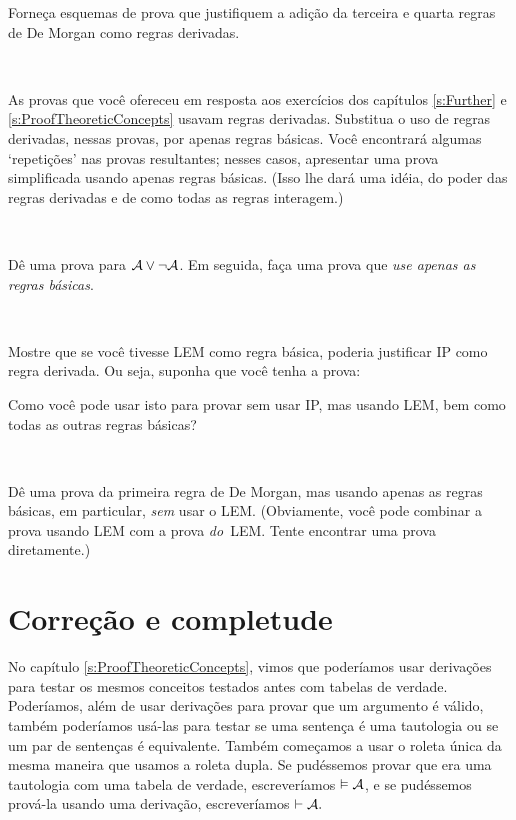 \practiceproblems

\problempart
Forne\c ca esquemas de prova que justifiquem a adi\c c\~ao da terceira e quarta regras de De Morgan como regras derivadas.

\

\problempart
As provas que voc\^e ofereceu em resposta aos exerc\'icios dos cap\'itulos  \ref{s:Further} e \ref{s:ProofTheoreticConcepts} usavam regras derivadas. Substitua o uso de regras derivadas, nessas provas, por apenas regras b\'asicas. Voc\^e encontrar\'a algumas `repeti\c c\~oes' nas provas resultantes; nesses casos, apresentar uma prova simplificada usando apenas regras b\'asicas. (Isso lhe dar\'a uma id\'eia, do poder das regras derivadas e de como todas as regras interagem.)

\

\problempart
D\^e uma prova para $\mathcal{A} \vee \neg\mathcal{A}$. Em seguida, fa\c ca uma prova que \emph{use apenas as regras b\'asicas}.

\

\problempart
Mostre que se voc\^e tivesse LEM como regra b\'asica, poderia justificar IP como regra derivada. Ou seja, suponha que voc\^e tenha a prova:
\begin{fitchproof}
  \open
  \close
\end{fitchproof}
Como voc\^e pode usar isto para provar  sem usar IP, mas usando
LEM, bem como todas as outras regras b\'asicas?

\

\problempart
D\^e uma prova da primeira regra de De Morgan, mas usando apenas as regras b\'asicas, em particular,  \emph{sem} usar o LEM. (Obviamente, voc\^e pode combinar a prova usando LEM com a prova  \emph{do}~LEM. Tente encontrar uma prova diretamente.)


\chapter{Corre\c c\~ao e completude}
\label{sec:soundness_and_completeness}

No cap\'itulo \ref{s:ProofTheoreticConcepts}, vimos que poder\'iamos usar deriva\c c\~oes para testar os mesmos conceitos testados antes com tabelas de verdade. Poder\'iamos, al\'em de usar deriva\c c\~oes para provar que um argumento \'e v\'alido, tamb\'em poder\'iamos us\'a-las para testar se uma senten\c ca \'e uma tautologia ou se um par de senten\c cas \'e equivalente. Tamb\'em come\c camos a usar o roleta \'unica da mesma maneira que usamos a roleta  dupla.  Se pud\'essemos provar que  era uma tautologia com uma tabela de verdade,  escrever\'iamos  $\vDash \mathcal{A}$, e se pud\'essemos prov\'a-la usando uma deriva\c c\~ao, escrever\'iamos $\vdash \mathcal{A}.$ 

